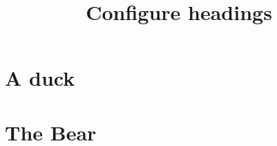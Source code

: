 \documentclass{article}
\title{Configure headings}
\begin{document}
\section{A duck}

\section
  [
    placement    =top, %
    number-format=\fbox{\theheading},
    prefix       =Part~,
    title-decls  =\scshape,
    toc          =TOC,
    bookmark     =BOOKMARK
  ]
  {The Bear}
\end{document}
